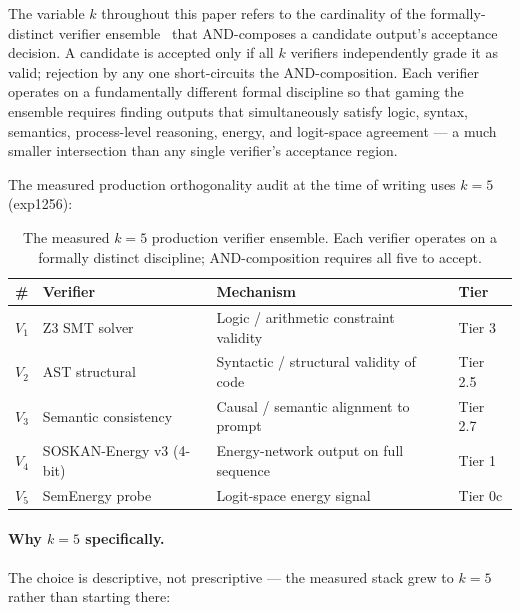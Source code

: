 \documentclass[10pt]{article}
\begin{document}
The variable $k$ throughout this paper refers to the cardinality of
the formally-distinct verifier ensemble~\cite{set_consistency_2025} that AND-composes a candidate
output's acceptance decision. A candidate is accepted only if all
$k$ verifiers independently grade it as valid; rejection by any one
short-circuits the AND-composition. Each verifier operates on a
fundamentally different formal discipline so that gaming the ensemble
requires finding outputs that simultaneously satisfy logic, syntax,
semantics, process-level reasoning, energy, and logit-space
agreement --- a much smaller intersection than any single verifier's
acceptance region.

The measured production orthogonality audit at the time of writing
uses $k=5$ (exp1256):

\begin{table}[h]
\centering
\small
\begin{tabular}{|l|l|l|l|}
\hline
\textbf{\#} & \textbf{Verifier} & \textbf{Mechanism} & \textbf{Tier} \\
\hline
$V_1$ & Z3 SMT solver        & Logic / arithmetic constraint validity & Tier 3 \\
$V_2$ & AST structural       & Syntactic / structural validity of code & Tier 2.5 \\
$V_3$ & Semantic consistency & Causal / semantic alignment to prompt    & Tier 2.7 \\
$V_4$ & SOSKAN-Energy v3 (4-bit) & Energy-network output on full sequence & Tier 1 \\
$V_5$ & SemEnergy probe      & Logit-space energy signal                 & Tier 0c \\
\hline
\end{tabular}
\caption{The measured $k=5$ production verifier ensemble. Each verifier
operates on a formally distinct discipline; AND-composition requires
all five to accept.}
\label{tab:k5}
\end{table}

\paragraph{Why $k=5$ specifically.} The choice is descriptive, not
prescriptive --- the measured stack grew to $k=5$ rather than starting
there:
\end{document}
